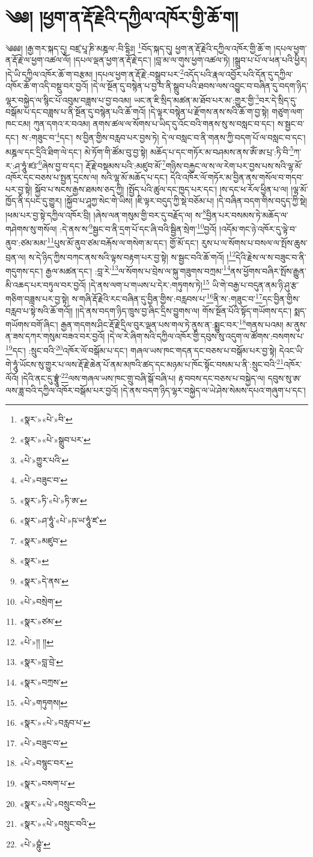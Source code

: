 \chapter{༄༅། །ཕྱག་ན་རྡོ་རྗེའི་དཀྱིལ་འཁོར་གྱི་ཆོ་ག།}༄༅༅། །རྒྱ་གར་སྐད་དུ། བཛྲ་པཱ་ཎི་མཎྜལ་:བི་དྷིཿ། \footnote{«སྣར་»«པེ་»བི་}བོད་སྐད་དུ། ཕྱག་ན་རྡོ་རྗེའི་དཀྱིལ་འཁོར་གྱི་ཆོ་ག །དཔལ་ཕྱག་ན་རྡོ་རྗེ་ལ་ཕྱག་འཚལ་ལོ། །དཔལ་ལྡན་ཕྱག་ན་རྡོ་རྗེ་དང་། །བླ་མ་ལ་གུས་ཕྱག་འཚལ་ཏེ། །སྒྲུབ་པ་པོ་ལ་ཕན་པའི་ཕྱིར། །དེ་ཡི་དཀྱིལ་འཁོར་ཆོ་ག་བརྩམ། །དཔལ་ཕྱག་ན་རྡོ་རྗེ་:བསྒྲུབ་པར་\footnote{«སྣར་»«པེ་»སྒྲུབ་པར་}འདོད་པའི་རྣལ་འབྱོར་པའི་དོན་དུ་དཀྱིལ་འཁོར་ཆོ་ག་འདི་བསྡུ་བར་བྱའོ། །དེ་ལ་སྔོན་དུ་བསྙེན་པ་བྱ་བ་ནི་སྒྲུབ་པའི་ཐབས་ལས་འབྱུང་བ་བཞིན་དུ་བདག་ཉིད་ལྷར་བསྐྱེད་ལ་སྙིང་པོ་འབུམ་བཟླས་པ་བྱ་བའམ། ཡང་ན་ཇི་སྲིད་མཚན་མ་ཐོབ་པར་མ་:གྱུར་གྱི་\footnote{«པེ་»གྱུར་པའི་}བར་དེ་སྲིད་དུ་བསྒོམ་པ་དང་བཟླས་པ་ནི་སྔོན་དུ་བསྙེན་པའི་ཆོ་གའོ། །དེ་ལྟར་བསྙེན་པ་རྫོགས་ནས་སའི་ཆོ་ག་བྱ་སྟེ། གཙུག་ལག་ཁང་ངམ། ཀུན་དགའ་ར་བའམ། ནགས་ཚལ་ལ་སོགས་པ་ཡིད་དུ་འོང་བའི་གནས་སུ་ས་བསླང་བ་དང་། ས་སྦྱང་བ་དང་། ས་:གཟུང་བ་\footnote{«པེ་»བཟུང་བ་}དང་། ས་བྱིན་གྱིས་བརླབ་པར་བྱས་ཏེ། དེ་ལ་བསླང་བ་ནི་གནས་ཀྱི་བདག་པོ་ལ་བསླང་བ་དང་། མཎྜལ་དང་དྲིའི་ཐིག་ལེ་དང་། མེ་ཏོག་གི་ཚོམ་བུ་བྱ་སྟེ། མཆོད་པ་དང་གཏོར་མ་བཤམས་ནས་ཨོཾ་ཨ་པྲ་:ཏི་བི་\footnote{«སྣར་»ཏི་«པེ་»ཏི་ཨ་}ཀ་ར་:ཤ་ཧཱུཾ་ཛཿ་\footnote{«སྣར་»ཤ་ཧཱུཾ་«པེ་»ཥ་ཡ་ཧཱུཾ་ཛ་}ཞེས་བྱ་བ་དང་། རྡོ་རྗེ་བསྡམས་པའི་:མཛུབ་མོ་\footnote{«སྣར་»མཛུབ་}གཉིས་བརྐྱང་ལ་ས་ལ་རེག་པར་བྱས་པས་སའི་ལྷ་མོ་འཁོར་དང་བཅས་པ་སྤྱན་དྲངས་ལ། སའི་ལྷ་མོ་མཆོད་པ་དང་། དེའི་འཁོར་ལོ་གཏོར་མ་བྱིན་ནས་གསོལ་བ་གདབ་པར་བྱ་སྟེ། སྐྱོབ་པ་སངས་རྒྱས་ཐམས་ཅད་ཀྱི། །སྤྱོད་པའི་ཚུལ་དང་ཁྱད་པར་དང་། །ས་དང་ཕ་རོལ་ཕྱིན་པ་ལ། །ལྷ་མོ་ཁྱོད་ནི་དཔང་དུ་གྱུར། །སྐྱོབ་པ་ཤཱཀྱ་སེང་གེ་ཡིས། །ཇི་ལྟར་བདུད་ཀྱི་སྡེ་བཅོམ་པ། །དེ་བཞིན་བདག་གིས་བདུད་ཀྱི་སྡེ། །ཕམ་པར་བྱ་སྟེ་དཀྱིལ་འཁོར་བྲི། །ཞེས་ལན་གསུམ་གྱི་བར་དུ་བརྗོད་ལ། ས་\footnote{«སྣར་»}བྱིན་པར་བསམས་ཏེ་མཆོད་ལ་གཤེགས་སུ་གསོལ། :དེ་ནས་ས་\footnote{«སྣར་»དེ་ནས་}སྦྱང་བ་ནི་དྲག་པོ་དང་ཞི་བའི་སྦྱིན་སྲེག་\footnote{«པེ་»བསྲེག་}བྱའོ། །འདོམ་གང་ཉེ་འཁོར་དུ་ལྟེ་བ་ནུབ་:ཙམ་མམ་\footnote{«སྣར་»ཙམ་}པུས་མོ་ནུབ་ཙམ་བརྐོས་ལ་གསེག་མ་དང་། གྱོ་མོ་དང་། རུས་པ་ལ་སོགས་པ་བསལ་ལ་སྤོས་ཆུས་བྲན་ལ། ས་དེ་ཉིད་ཀྱིས་བཀང་ནས་སའི་ལྟས་བརྟག་པར་བྱ་སྟེ། ས་སྦྱང་བའི་ཆོ་གའོ། །\footnote{«པེ་»།། །།}དེའི་རྗེས་ལ་ས་བཟུང་བ་ནི་གདུགས་དང་། རྒྱལ་མཚན་དང་། :བླ་རེ་\footnote{«སྣར་»བླ་བྲེ་}ལ་སོགས་པ་བྲེས་ལ་སྐུ་གཟུགས་བཀྲམ་\footnote{«སྣར་»བཀྲས་}ནས་ཕྱོགས་བཞིར་སྤོས་རྒྱུན་མི་འཆད་པར་བཏུལ་བར་བྱའོ། །དེ་ནས་ལག་པ་གཡས་པ་དེར་:གཏུགས་ཏེ།\footnote{«པེ་»གཏུགས།} ཡི་གེ་བརྒྱ་པ་བདུན་ནམ་ཉི་ཤུ་རྩ་གཅིག་བཟླས་པར་བྱ་སྟེ། ས་གཞི་རྡོ་རྗེའི་རང་བཞིན་དུ་བྱིན་གྱིས་:བརླབས་པ་\footnote{«སྣར་»«པེ་»བརླབ་པ་}ནི་ས་:གཟུང་བ་\footnote{«པེ་»བཟུང་བ་}དང་བྱིན་གྱིས་བརླབ་པ་སྟེ་སའི་ཆོ་གའོ།། །།དེ་ནས་བདག་ཉིད་ཁྲུས་བྱ་ཞིང་དྲིས་བྱུགས་ལ། གོས་སྔོན་པོའི་སྟོད་གཡོགས་དང་། སྨད་གཡོགས་བགོ་ཞིང་། རྒྱན་གདགས་ཤིང་རྡོ་རྗེ་དྲིལ་བུར་ལྡན་པས་གལ་ཏེ་ནུས་ན་:སྨྱུང་བར་\footnote{«པེ་»བསྙུང་བར་}གནས་པའམ། མ་ནུས་ན་ཟས་དཀར་གསུམ་བཟའ་བར་བྱའོ། །དེ་ལ་རེ་ཞིག་སའི་དཀྱིལ་འཁོར་གྱི་དབུས་སུ་འདུག་ལ་ཚོགས་:བསགས་པ་\footnote{«སྣར་»བསག་པ་}དང་། :སྲུང་བའི་\footnote{«སྣར་»«པེ་»བསྲུང་བའི་}འཁོར་ལོ་བསྒོམ་པ་དང་། གཞལ་ཡས་ཁང་གདན་དང་བཅས་པ་བསྒོམ་པར་བྱ་སྟེ། དེའང་ཡི་གེ་ཧཱུཾ་ཡོངས་སུ་གྱུར་པ་ལས་རྡོ་རྗེ་ཆེན་པོ་ནམ་མཁའི་ཚད་དང་མཉམ་པ་ཁོང་སྟོང་བསམ་པ་ནི་:སྲུང་བའི་\footnote{«སྣར་»«པེ་»བསྲུང་བའི་}འཁོར་ལོའོ། །དེའི་ནང་དུ་བྷྲཱུཾ་\footnote{«པེ་»བྷུཾ་}ལས་གཞལ་ཡས་ཁང་གྲུ་བཞི་སྒོ་བཞི་པ། རྟ་བབས་དང་བཅས་པ་བསྐྱེད་ལ། དབུས་སུ་ཨ་ལས་ཟླ་བའི་དཀྱིལ་འཁོར་བསྒོམ་པར་བྱའོ། །དེ་ནས་བདག་ཉིད་ལྷར་བསྐྱེད་ལ་ཡེ་ཤེས་སེམས་དཔའ་གཞུག་པ་དང་། 